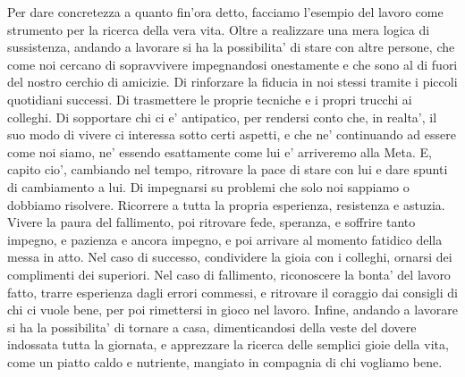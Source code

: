 Per dare concretezza a quanto fin'ora detto, facciamo l'esempio del lavoro come strumento per la ricerca della vera vita. Oltre a realizzare una mera logica di sussistenza, andando a lavorare si ha la possibilita' di stare con altre persone, che come noi cercano di sopravvivere impegnandosi onestamente e che sono al di fuori del nostro cerchio di amicizie. Di rinforzare la fiducia in noi stessi tramite i piccoli quotidiani successi. Di trasmettere le proprie tecniche e i propri trucchi ai colleghi. Di sopportare chi ci e' antipatico, per rendersi conto che, in realta', il suo modo di vivere ci interessa sotto certi aspetti, e che ne' continuando ad essere come noi siamo, ne' essendo esattamente come lui e' arriveremo alla Meta. E, capito cio', cambiando nel tempo, ritrovare la pace di stare con lui e dare spunti di cambiamento a lui. Di impegnarsi su problemi che solo noi sappiamo o dobbiamo risolvere. Ricorrere a tutta la propria esperienza, resistenza e astuzia. Vivere la paura del fallimento, poi ritrovare fede, speranza, e soffrire tanto impegno, e pazienza e ancora impegno, e poi arrivare al momento fatidico della messa in atto. Nel caso di successo, condividere la gioia con i colleghi, ornarsi dei complimenti dei superiori. Nel caso di fallimento, riconoscere la bonta' del lavoro fatto, trarre esperienza dagli errori commessi, e ritrovare il coraggio dai consigli di chi ci vuole bene, per poi rimettersi in gioco nel lavoro.  Infine, andando a lavorare si ha la possibilita' di tornare a casa, dimenticandosi della veste del dovere indossata tutta la giornata, e apprezzare la ricerca delle semplici gioie della vita, come un piatto caldo e nutriente, mangiato in compagnia di chi vogliamo bene.

